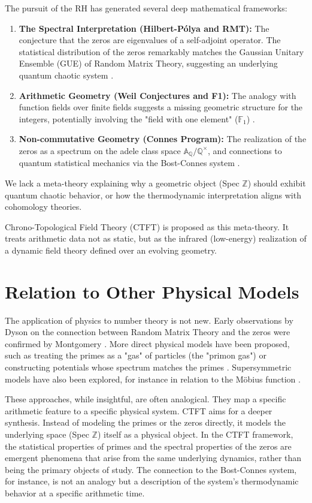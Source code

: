 \documentclass[11pt, a4paper]{article}
\theoremstyle{definition}
\newcommand{\Z}{\mathbb{Z}}
\newcommand{\Q}{\mathbb{Q}}
\newcommand{\A}{\mathbb{A}}
\newcommand{\F}{\mathbb{F}_1}
\begin{document}
The pursuit of the RH has generated several deep mathematical frameworks:
\begin{enumerate}
    \item \textbf{The Spectral Interpretation (Hilbert-Pólya and RMT):} The conjecture that the zeros are eigenvalues of a self-adjoint operator. The statistical distribution of the zeros remarkably matches the Gaussian Unitary Ensemble (GUE) of Random Matrix Theory, suggesting an underlying quantum chaotic system \cite{Montgomery1973, Berry1999}.
    \item \textbf{Arithmetic Geometry (Weil Conjectures and F1):} The analogy with function fields over finite fields suggests a missing geometric structure for the integers, potentially involving the "field with one element" ($\F$) \cite{Deligne1974}.
    \item \textbf{Non-commutative Geometry (Connes Program):} The realization of the zeros as a spectrum on the adele class space $\A_\Q/\Q^\times$, and connections to quantum statistical mechanics via the Bost-Connes system \cite{Bost1995, Connes1999}.
\end{enumerate}

We lack a meta-theory explaining why a geometric object (Spec $\Z$) should exhibit quantum chaotic behavior, or how the thermodynamic interpretation aligns with cohomology theories.

Chrono-Topological Field Theory (CTFT) is proposed as this meta-theory. It treats arithmetic data not as static, but as the infrared (low-energy) realization of a dynamic field theory defined over an evolving geometry.
\section{Relation to Other Physical Models}
The application of physics to number theory is not new. Early observations by Dyson on the connection between Random Matrix Theory and the zeros \cite{Dyson1972} were confirmed by Montgomery \cite{Montgomery1973}. More direct physical models have been proposed, such as treating the primes as a "gas" of particles (the "primon gas") or constructing potentials whose spectrum matches the primes \cite{Mussardo2011}. Supersymmetric models have also been explored, for instance in relation to the Möbius function \cite{Spector1990}.

These approaches, while insightful, are often analogical. They map a specific arithmetic feature to a specific physical system. CTFT aims for a deeper synthesis. Instead of modeling the primes or the zeros directly, it models the underlying space (Spec $\Z$) itself as a physical object. In the CTFT framework, the statistical properties of primes and the spectral properties of the zeros are emergent phenomena that arise from the same underlying dynamics, rather than being the primary objects of study. The connection to the Bost-Connes system, for instance, is not an analogy but a description of the system's thermodynamic behavior at a specific arithmetic time.
\end{document}
